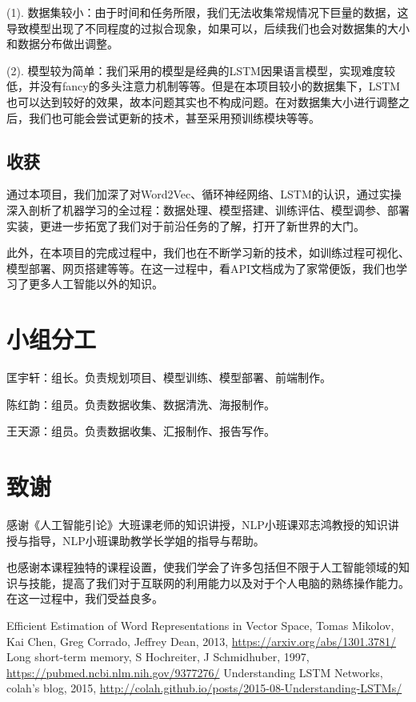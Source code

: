 \documentclass[12pt,a4paper]{article}
\begin{document}
(1). 数据集较小：由于时间和任务所限，我们无法收集常规情况下巨量的数据，这导致模型出现了不同程度的过拟合现象，如果可以，后续我们也会对数据集的大小和数据分布做出调整。

(2). 模型较为简单：我们采用的模型是经典的LSTM因果语言模型，实现难度较低，并没有fancy的多头注意力机制等等。但是在本项目较小的数据集下，LSTM也可以达到较好的效果，故本问题其实也不构成问题。在对数据集大小进行调整之后，我们也可能会尝试更新的技术，甚至采用预训练模块等等。

\subsection{收获}
通过本项目，我们加深了对Word2Vec、循环神经网络、LSTM的认识，通过实操深入剖析了机器学习的全过程：数据处理、模型搭建、训练评估、模型调参、部署实装，更进一步拓宽了我们对于前沿任务的了解，打开了新世界的大门。

此外，在本项目的完成过程中，我们也在不断学习新的技术，如训练过程可视化、模型部署、网页搭建等等。在这一过程中，看API文档成为了家常便饭，我们也学习了更多人工智能以外的知识。


\section*{小组分工}

匡宇轩：组长。负责规划项目、模型训练、模型部署、前端制作。

陈红韵：组员。负责数据收集、数据清洗、海报制作。

王天源：组员。负责数据收集、汇报制作、报告写作。

\section*{致谢}

感谢《人工智能引论》大班课老师的知识讲授，NLP小班课邓志鸿教授的知识讲授与指导，NLP小班课助教学长学姐的指导与帮助。

也感谢本课程独特的课程设置，使我们学会了许多包括但不限于人工智能领域的知识与技能，提高了我们对于互联网的利用能力以及对于个人电脑的熟练操作能力。在这一过程中，我们受益良多。


\begin{thebibliography}{99} 
\setmainfont{Times New Roman}
Efficient Estimation of Word Representations in Vector Space, Tomas Mikolov, Kai Chen, Greg Corrado, Jeffrey Dean, 2013, \href{https://arxiv.org/abs/1301.3781/}{https://arxiv.org/abs/1301.3781/}
Long short-term memory, S Hochreiter, J Schmidhuber, 1997, \href{https://pubmed.ncbi.nlm.nih.gov/9377276/}{https://pubmed.ncbi.nlm.nih.gov/9377276/}
Understanding LSTM Networks, colah's blog, 2015, \href{http://colah.github.io/posts/2015-08-Understanding-LSTMs/}{http://colah.github.io/posts/2015-08-Understanding-LSTMs/}
\end{thebibliography}
\end{document}
